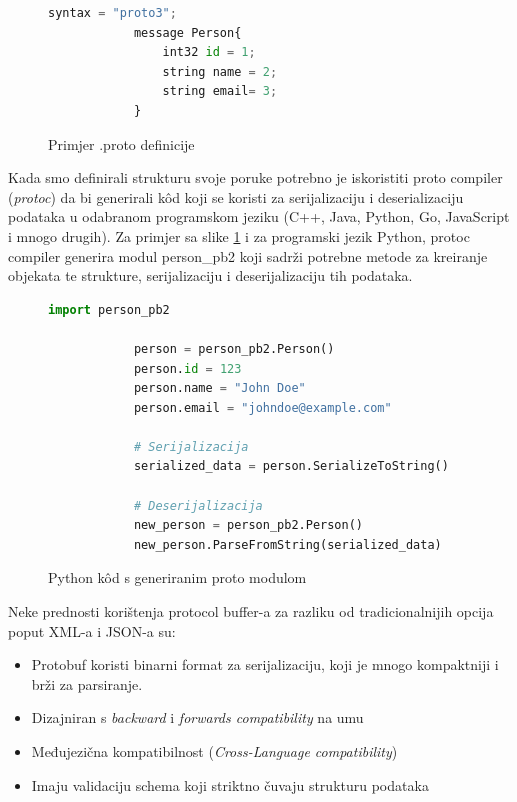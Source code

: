 \documentclass[zavrsnirad]{fer}
\begin{document}
\begin{figure}[H]
	\centering
	\begin{minipage}{0.6\linewidth}
		\begin{lstlisting}[language=Python]
			syntax = "proto3";
			message Person{
				int32 id = 1;
				string name = 2;
				string email= 3;
			}
		\end{lstlisting}
	\end{minipage}
	\caption{Primjer .proto definicije}
	\label{slk:proto}
\end{figure}		


Kada smo definirali strukturu svoje poruke potrebno je iskoristiti proto compiler (\textit{protoc}) da bi generirali k\^od koji se koristi za serijalizaciju i deserializaciju podataka u odabranom programskom jeziku (C++, Java, Python, Go, JavaScript i mnogo drugih). Za primjer sa slike \ref{slk:proto} i za programski jezik Python, protoc compiler generira modul person\_pb2 koji sadrži potrebne metode za kreiranje objekata te strukture, serijalizaciju i deserijalizaciju tih podataka. 

\begin{figure}[h]
	\centering
	\begin{minipage}{0.8\linewidth}
		\begin{lstlisting}[language=Python]
			import person_pb2
			
			person = person_pb2.Person()
			person.id = 123
			person.name = "John Doe"
			person.email = "johndoe@example.com"
			
			# Serijalizacija
			serialized_data = person.SerializeToString()
			
			# Deserijalizacija
			new_person = person_pb2.Person()
			new_person.ParseFromString(serialized_data)
		\end{lstlisting}
	\end{minipage}
	\caption{Python k\^od s generiranim proto modulom}
	\label{slk:proto_kod}
\end{figure}

Neke prednosti korištenja protocol buffer-a za razliku od tradicionalnijih opcija poput XML-a i JSON-a su:

\begin{itemize}
	\item Protobuf koristi binarni format za serijalizaciju, koji je mnogo kompaktniji i brži za parsiranje.
	\item Dizajniran s \textit{backward} i \textit{forwards compatibility} na umu 
	\item Međujezična kompatibilnost (\textit{Cross-Language compatibility})
	\item Imaju validaciju schema koji striktno čuvaju strukturu podataka
\end{itemize}
\end{document}
